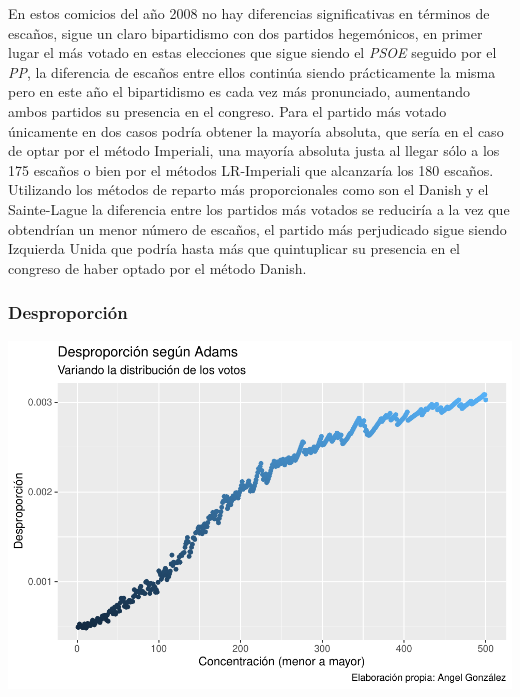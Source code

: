 \documentclass[12pt,a4paper,]{book}
\numberwithin{dummy}{section}
\theoremstyle{ocrenumbox}
\theoremstyle{blacknumex}
\theoremstyle{blacknumbox}
\theoremstyle{ocrenum}
\theoremstyle{ocrenum}
\begin{document}
En estos comicios del año 2008 no hay diferencias significativas en
términos de escaños, sigue un claro bipartidismo con dos partidos
hegemónicos, en primer lugar el más votado en estas elecciones que sigue
siendo el \emph{PSOE} seguido por el \emph{PP}, la diferencia de escaños
entre ellos continúa siendo prácticamente la misma pero en este año el
bipartidismo es cada vez más pronunciado, aumentando ambos partidos su
presencia en el congreso. Para el partido más votado únicamente en dos
casos podría obtener la mayoría absoluta, que sería en el caso de optar
por el método Imperiali, una mayoría absoluta justa al llegar sólo a los
175 escaños o bien por el métodos LR-Imperiali que alcanzaría los 180
escaños. Utilizando los métodos de reparto más proporcionales como son
el Danish y el Sainte-Lague la diferencia entre los partidos más votados
se reduciría a la vez que obtendrían un menor número de escaños, el
partido más perjudicado sigue siendo Izquierda Unida que podría hasta
más que quintuplicar su presencia en el congreso de haber optado por el
método Danish.

\hypertarget{desproporciuxf3n-9}{%
\subsubsection{Desproporción}\label{desproporciuxf3n-9}}

\begin{center}\includegraphics[width=1\linewidth]{figurasR/unnamed-chunk-33-1} \end{center}
\end{document}
